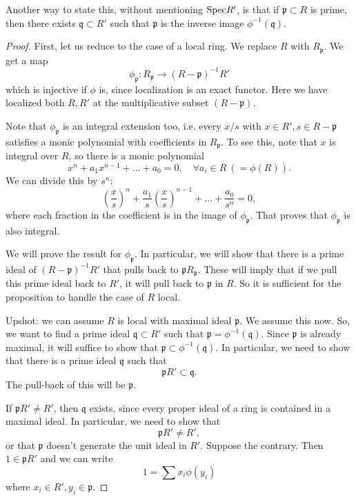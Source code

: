 Another way to state this, without mentioning $\mathrm{Spec} R'$, is that if
$\mathfrak{p} \subset R$ is prime, then there exists $\mathfrak{q} \subset R'$
such that $\mathfrak{p}$ is the inverse image $\phi^{-1}(\mathfrak{q})$.

\begin{proof} 
First, let us reduce to the case of a local ring. 
We replace $R$ with $R_{\mathfrak{p}}$.  We get a map
\[ \phi_{\mathfrak{p}}: R_{\mathfrak{p}} \to (R- \mathfrak{p})^{-1} R'  \]
which is injective if $\phi$ is, since localization is an exact functor. Here we
have localized both $R, R'$ at the multiplicative subset $(R - \mathfrak{p})$.

Note that $\phi_{\mathfrak{p}}$ is an integral extension too, i.e. every $x/s$
with $x \in R', s \in R - \mathfrak{p}$ satisfies a monic polynomial with
coefficients in $R_{\mathfrak{p}}$. To see this, note that $x$ is integral over
$R$, so there is a monic polynomial
\[ x^n + a_1 x^{n-1} + \dots + a_0 = 0, \quad \forall a_i \in R \ (=\phi(R)).  \]
We can divide this by $s^n$:
\[ (\frac{x}{s})^n  + \frac{a_1}{s} (\frac{x}{s})^{n-1} + \dots +
\frac{a_0}{s^n} = 0,  \]
where each fraction in the coefficient is in the image of $\phi_{\mathfrak{p}}$.
That proves that $\phi_{\mathfrak{p}}$ is also integral.

We will prove the result for $\phi_{\mathfrak{p}}$.  In particular, we will show
that there is a prime ideal of $(R- \mathfrak{p})^{-1} R'$ that pulls back to
$\mathfrak{p}R_{\mathfrak{p}}$. These will imply that if we pull this prime
ideal back to $R'$, it will pull back to $\mathfrak{p}$ in $R$.
So it is sufficient for the proposition to handle the case of $R$ local.  

Upshot: we can assume $R$ is local with maximal ideal $\mathfrak{p}$. We assume
this now.
So, we want to find a prime ideal $\mathfrak{q} \subset R'$ such that
$\mathfrak{p}  = \phi^{-1}(\mathfrak{q})$. Since $\mathfrak{p}$ is already
maximal, it will suffice to show that $\mathfrak{p} \subset
\phi^{-1}(\mathfrak{q})$. In particular, we need to show that there is a prime
ideal $\mathfrak{q}$ such that
\[ \mathfrak{p} R' \subset \mathfrak{q}.  \]
The pull-back of this will be $\mathfrak{p}$. 

If $\mathfrak{p}R' \neq R'$, then
$\mathfrak{q}$ exists, since every proper ideal of a ring is contained in a
maximal ideal. In particular, we need to show that
\[ \mathfrak{p} R' \neq R', \]
or that $\mathfrak{p}$ doesn't generate the unit ideal in $R'$. Suppose the
contrary. Then $1 \in \mathfrak{p}R'$ and we can write
\[ 1 = \sum x_i \phi(y_i)  \]
where $x_i \in R', y_i \in \mathfrak{p}$. 


\end{proof}
